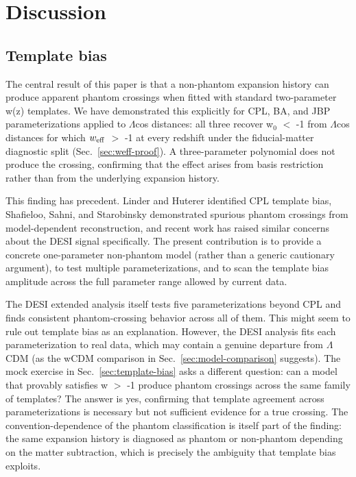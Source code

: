 \section{Discussion}\label{sec:discussion}

\subsection{Template bias}\label{sec:disc-tb}

The central result of this paper is that a non-phantom expansion history
can produce apparent phantom crossings when fitted with standard
two-parameter w(z) templates. We have demonstrated this explicitly for
CPL, BA, and JBP parameterizations applied to $\Lambda$cos distances: all three
recover w$_0$ $<$ -1 from $\Lambda$cos distances for which $w_{\rm eff}$
$>$ -1 at every redshift under the fiducial-matter diagnostic
split (Sec.~\ref{sec:weff-proof}). A three-parameter polynomial does not produce the crossing,
confirming that the effect arises from basis restriction rather than
from the underlying expansion history.

This finding has precedent. Linder and Huterer \cite{ref12} identified CPL
template bias, Shafieloo, Sahni, and Starobinsky \cite{ref13} demonstrated
spurious phantom crossings from model-dependent reconstruction, and
recent work \cite{ref8,ref14} has raised similar concerns about the DESI signal
specifically. The present contribution is to provide a concrete
one-parameter non-phantom model (rather than a generic cautionary
argument), to test multiple parameterizations, and to scan the template
bias amplitude across the full parameter range allowed by current data.

The DESI extended analysis \cite{ref9} itself tests five parameterizations
beyond CPL and finds consistent phantom-crossing behavior across all of
them. This might seem to rule out template bias as an explanation.
However, the DESI analysis fits each parameterization to real data,
which may contain a genuine departure from $\Lambda$CDM (as the wCDM comparison
in Sec.~\ref{sec:model-comparison} suggests). The mock exercise in Sec.~\ref{sec:template-bias} asks a different question:
can a model that provably satisfies w $>$ -1 produce phantom
crossings across the same family of templates? The answer is yes,
confirming that template agreement across parameterizations is necessary
but not sufficient evidence for a true crossing. The
convention-dependence of the phantom classification is itself part of
the finding: the same expansion history is diagnosed as phantom or
non-phantom depending on the matter subtraction, which is precisely the
ambiguity that template bias exploits.

